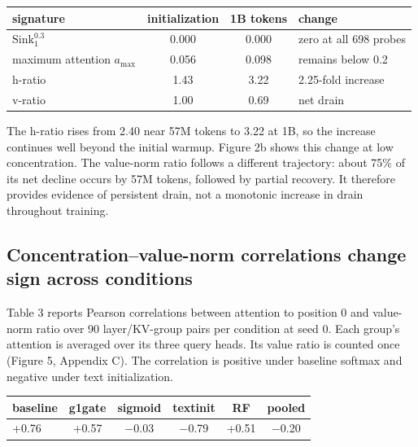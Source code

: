 \documentclass{article}
\begin{document}
\begin{center}
\begin{minipage}{\linewidth}
\makeatletter{}\makeatother
  \centering
  \small
  \caption{\textbf{RF, one seed, initialization to 1B tokens.}}
  \begin{tabular}{lccl}
    \toprule
    signature & initialization & 1B tokens & change \\
    \midrule
    $\mathrm{Sink}^{0.3}_{1}$ & 0.000 & 0.000 & zero at all 698 probes \\
    maximum attention $a_{\max}$ & 0.056 & 0.098 & remains below 0.2 \\
    h-ratio & 1.43 & 3.22 & 2.25-fold increase \\
    v-ratio & 1.00 & 0.69 & net drain \\
    \bottomrule
  \end{tabular}
\end{minipage}
\end{center}

The h-ratio rises from 2.40 near 57M tokens to 3.22 at 1B, so the increase continues well beyond the initial warmup. Figure 2b shows this change at low concentration. The value-norm ratio follows a different trajectory: about 75\% of its net decline occurs by 57M tokens, followed by partial recovery. It therefore provides evidence of persistent drain, not a monotonic increase in drain throughout training.

\subsection{Concentration--value-norm correlations change sign across conditions}

Table 3 reports Pearson correlations between attention to position 0 and value-norm ratio over 90 layer/KV-group pairs per condition at seed 0. Each group's attention is averaged over its three query heads. Its value ratio is counted once (Figure 5, Appendix C). The correlation is positive under baseline softmax and negative under text initialization.

\begin{center}
\begin{minipage}{\linewidth}
\makeatletter{}\makeatother
  \centering
  \small
  \caption{\textbf{Pearson r across 90 layer/KV-group pairs at the final available reprobe, seed 0.}}
  \begin{tabular}{lccccc}
    \toprule
    baseline & g1gate & sigmoid & textinit & RF & pooled \\
    \midrule
    +0.76 & +0.57 & $-$0.03 & $-$0.79 & +0.51 & $-$0.20 \\
    \bottomrule
  \end{tabular}
\end{minipage}
\end{center}
\end{document}
